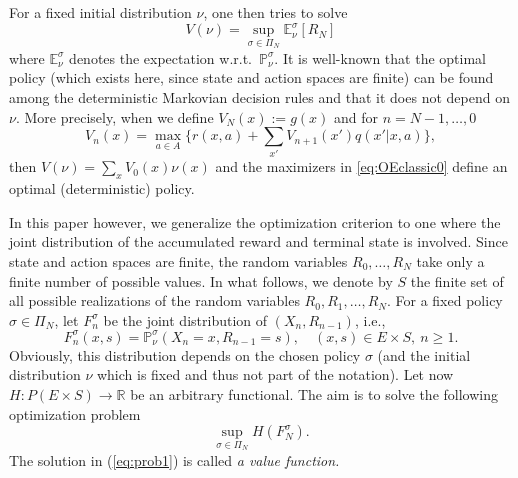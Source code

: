 \documentclass[reqno, 12pt]{amsart}%
\newcommand{\R}{\mathbb{R}} %
\newcommand{\PP}{\mathbb{P}}
\newcommand{\EE}{\mathbb{E}}
\theoremstyle{definition}
\numberwithin{equation}{section} \numberwithin{theorem}{section}
\begin{document}
For a fixed initial distribution $\nu$, one then tries to solve
$$ V(\nu) = \sup_{\sigma\in \Pi_N} \EE_{\nu}^\sigma[R_N]$$
where $\EE_{\nu}^\sigma$ denotes the expectation w.r.t.\ $\PP_{\nu}^\sigma$.
It is well-known that the optimal policy (which exists here, since state and action spaces are finite) can be found among the deterministic Markovian decision rules and that it does not depend on $\nu$. 
More precisely, when we define $V_N(x):= g(x)$ and for $n=N-1,\ldots,0$
\begin{equation}\label{eq:OEclassic0}
    V_n(x)= \max_{a\in A} \big\{r(x,a) +
    \sum_{x'}  V_{n+1}(x')q(x'|x,a)\big\},
\end{equation} 
then $V(\nu)= \sum_{x} V_0(x) \nu(x)$ and the maximizers in \eqref{eq:OEclassic0} define an optimal (deterministic) policy.

In this paper however, we generalize the 
optimization criterion to one where the joint 
distribution of the accumulated reward and terminal 
state is involved. Since state and action spaces 
are finite, the random variables $R_0,\ldots, R_N$ 
take only a finite number of possible values. In 
what follows, we denote by  $S$ the finite set of 
all possible realizations of the random variables 
$R_0,R_1,\ldots ,R_N$. 
For a fixed policy $\sigma\in \Pi_N$, let  $F_n^{\sigma}$ be the joint distribution of $(X_{n},R_{n-1})$, i.e.,
$$ F_n^\sigma(x,s) = \PP_\nu^\sigma(X_{n}=x,R_{n-1}=s), \quad (x,s)\in E\times S, \ n\ge 1.$$ 
Obviously, this distribution depends on the chosen policy $\sigma$ (and the initial distribution $\nu$ which is fixed and thus not part of the notation).  Let now $H:P(E\times S) \to 
\R$ be an arbitrary functional. The aim is to solve
the following optimization problem
\begin{equation}\label{eq:prob1}
    \sup_{\sigma\in \Pi_N} H(F_N^\sigma).
\end{equation} 
The solution in (\ref{eq:prob1})
 is called {\it a value function.}  \\
\end{document}
